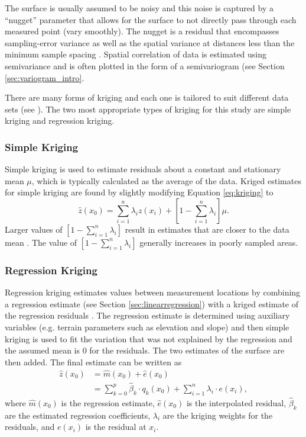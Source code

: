 \documentclass[12pt]{article}
\begin{document}
The surface is usually assumed to be noisy and this noise is captured by a ``nugget'' parameter that allows for the surface to not directly pass through each measured point (vary smoothly). The nugget is a residual that encompasses sampling-error variance as well as the spatial variance at distances less than the minimum sample spacing \citep{Li2008}. Spatial correlation of data is estimated using semivariance and is often plotted in the form of a semivariogram (see Section \ref{sec:variogram_intro}.  

There are many forms of kriging and each one is tailored to suit different data sets (see \cite{Li2014}). The two most appropriate types of kriging for this study are simple kriging and regression kriging. 

\subsubsection{Simple Kriging}

Simple kriging is used to estimate residuals about a constant and stationary mean $\mu$, which is typically calculated as the average of the data. Kriged estimates for simple kriging are found by slightly modifying Equation \ref{eq:kriging} to 
\begin{equation}
\hat{z}(x_0) = \sum_{i=1}^{n} \lambda_i z(x_i) +\left[1-\sum_{i=1}^{n} \lambda_i \right]\mu.
\end{equation}
Larger values of $\left[1-\sum_{i=1}^{n} \lambda_i \right]$ result in estimates that are closer to the data mean \citep{Li2008}. The value of $\left[1-\sum_{i=1}^{n} \lambda_i \right]$ generally increases in poorly sampled areas. 

\subsubsection{Regression Kriging}

Regression kriging estimates values between measurement locations by combining a regression estimate (see Section \ref{sec:linearregression}) with a kriged estimate of the regression residuals \citep{Hengl2007}. The regression estimate is determined using auxiliary variables (e.g. terrain parameters such as elevation and slope) and then simple kriging is used to fit the variation that was not explained by the regression and the assumed mean is 0 for the residuals. The two estimates of the surface are then added. The final estimate can be written as 
\begin{align}
\hat{z}(x_0) &= \hat{m}(x_0) + \hat{e}(x_0)\\
& = \sum^p_{k=0}\hat{\beta}_k \cdot	q_k(x_0)+ \sum_{i=1}^{n} \lambda_i \cdot e(x_i),
\end{align}
where $\hat{m}(x_0)$ is the regression estimate, $\hat{e}(x_0)$ is the interpolated residual, $\hat{\beta}_k$ are the estimated regression coefficients, $\lambda_i$ are the kriging weights for the residuals, and $e(x_i)$ is the residual at $x_i$.
\end{document}
